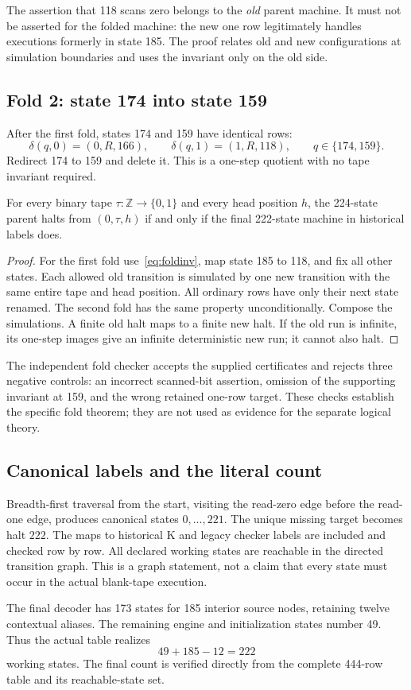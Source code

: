 The assertion that 118 scans zero belongs to the \emph{old} parent
machine. It must not be asserted for the folded machine: the new one
row legitimately handles executions formerly in state 185. The proof
relates old and new configurations at simulation boundaries and uses
the invariant only on the old side.

\subsection{Fold 2: state 174 into state 159}

After the first fold, states 174 and 159 have identical rows:
\[
        \delta(q,0)=(0,R,166),\qquad
        \delta(q,1)=(1,R,118),\qquad q\in\{174,159\}.
\]
Redirect 174 to 159 and delete it. This is a one-step quotient with no
tape invariant required.

\begin{proposition}
For every binary tape $\tau:\mathbb Z\to\{0,1\}$ and every head
position $h$, the 224-state parent halts from $(0,\tau,h)$ if and only
if the final 222-state machine in historical labels does.
\end{proposition}
\begin{proof}
For the first fold use~\eqref{eq:foldinv}, map state 185 to 118, and fix
all other states. Each allowed old transition is simulated by one new
transition with the same entire tape and head position. All ordinary
rows have only their next state renamed. The second fold has the same
property unconditionally. Compose the simulations. A finite old halt
maps to a finite new halt. If the old run is infinite, its one-step
images give an infinite deterministic new run; it cannot also halt.
\end{proof}

The independent fold checker accepts the supplied certificates and
rejects three negative controls: an incorrect scanned-bit assertion,
omission of the supporting invariant at 159, and the wrong retained
one-row target. These checks establish the specific fold theorem;
they are not used as evidence for the separate logical theory.

\subsection{Canonical labels and the literal count}

Breadth-first traversal from the start, visiting the read-zero edge
before the read-one edge, produces canonical states $0,\ldots,221$.
The unique missing target becomes halt $222$. The maps to historical
K and legacy checker labels are included and checked row by row.
All declared working states are reachable in the directed transition
graph. This is a graph statement, not a claim that every state must
occur in the actual blank-tape execution.

The final decoder has 173 states for 185 interior source nodes, retaining
twelve contextual aliases. The remaining engine and initialization
states number 49. Thus the actual table realizes
\[
                49+185-12=222
\]
working states. The final count is verified directly from the complete
444-row table and its reachable-state set.
